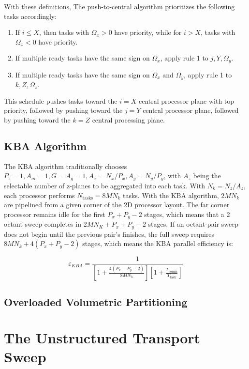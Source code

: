 \documentclass[11pt, letterpaper,titlepage,oneside]{article}
\begin{document}
With these definitions, The push-to-central algorithm prioritizes the following tasks accordingly:
\begin{enumerate}
\item If $i \leq X$, then tasks with $\Omega_x > 0$ have priority, while for $i > X$, tasks with $\Omega_x < 0$ have priority.
\item If multiple ready tasks have the same sign on $\Omega_x$, apply rule 1 to $j,Y,\Omega_y$.
\item If multiple ready tasks have the same sign on $\Omega_x$ and $\Omega_y$, apply rule 1 to $k,Z, \Omega_z$.
\end{enumerate}
This schedule pushes tasks toward the $i = X$ central processor plane with top priority, followed by pushing toward the $j = Y$ central processor plane, followed by pushing toward the $k = Z$ central processing plane\cite{mpadams2013}.

\subsection*{KBA Algorithm}

The KBA algorithm traditionally chooses $P_z = 1, A_m = 1, G = A_g = 1, A_x = N_x/P_x, A_y = N_y/P_y$, with $A_z$ being the selectable number of z-planes to be aggregated into each task. With $N_k = N_z/A_z$, each processor performs $N_{\text{tasks}} = 8MN_k$ tasks. With the KBA algorithm, $2MN_k$ are pipelined from a given corner of the 2D processor layout. The far corner processor remains idle for the first $P_x + P_y - 2 $ stages, which means that a 2 octant sweep completes in $2MN_K + P_x + P_y - 2$ stages. If an octant-pair sweep does not begin until the previous pair's finishes, the full sweep requires $8MN_k + 4(P_x+P_y-2)$ stages, which means the KBA parallel efficiency is:

\begin{equation}
\varepsilon_{KBA} = \frac{1}{[1+\frac{4(P_x+P_y-2)}{8MN_k}][1+\frac{T_{\text{comm}}}{T_{\text{task}}}]}
\label{eKBA}
\end{equation}

\subsection*{Overloaded Volumetric Partitioning}


\section*{The Unstructured Transport Sweep}
\end{document}
